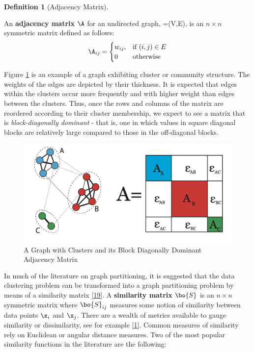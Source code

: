 \documentclass[
]{article}
\theoremstyle{definition}
\newtheorem{definition}{Definition}[section]
\theoremstyle{definition}
\theoremstyle{definition}
\theoremstyle{definition}
\theoremstyle{remark}
\begin{document}
\begin{definition}[Adjacency Matrix]
\protect\hypertarget{def:adjmat}{}\label{def:adjmat}

An \textbf{adjacency matrix} \(\A\) for an undirected graph, =(V,E), is an \(n \times n\) symmetric matrix defined as follows:
\[\A_{ij}=
\begin{cases}
w_{ij}, & \text{if } (i,j) \in E \\
0 & \text{otherwise}
\end{cases}\]

\end{definition}

Figure \ref{fig:introexg} is an example of a graph exhibiting cluster or community structure. The weights of the edges are depicted by their thickness. It is expected that edges within the clusters occur more frequently and with higher weight than edges between the clusters. Thus, once the rows and columns of the matrix are reordered according to their cluster membership, we expect to see a matrix that is \emph{block-diagonally dominant} - that is, one in which values in square diagonal blocks are relatively large compared to those in the off-diagonal blocks.

\begin{figure}

{\centering \includegraphics[width=1\linewidth]{figs/introexg} 

}

\caption{A Graph with Clusters and its Block Diagonally Dominant Adjacency Matrix}\label{fig:introexg}
\end{figure}

In much of the literature on graph partitioning, it is suggested that the data clustering problem can be transformed into a graph partitioning problem by means of a similarity matrix \protect\hyperlink{ref-poweriteration}{{[}19{]}}. A \textbf{similarity matrix} \(\bo{S}\) is an \(n \times n\) symmetric matrix where \(\bo{S}_{ij}\) measures some notion of similarity between data points \(\x_i\) and \(\x_j\). There are a wealth of metrics available to gauge similarity or dissimilarity, see for example \protect\hyperlink{ref-dcebook}{{[}1{]}}. Common measures of similarity rely on Euclidean or angular distance measures. Two of the most popular similarity functions in the literature are the following:
\end{document}
